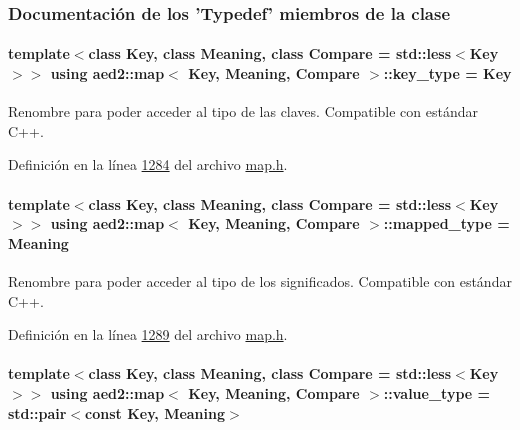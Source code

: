 \subsubsection{Documentación de los 'Typedef' miembros de la clase}
\hypertarget{classaed2_1_1map_a4273e8812e7105a618df58a2c8b72b7d_a4273e8812e7105a618df58a2c8b72b7d}{
\paragraph[{key\-\_\-type}]{\setlength{\rightskip}{0pt plus 5cm}template$<$class Key, class Meaning, class Compare = std\-::less$<$\-Key$>$$>$ using {\bf aed2\-::map}$<$ Key, Meaning, Compare $>$\-::{\bf key\-\_\-type} =  Key}}\label{classaed2_1_1map_a4273e8812e7105a618df58a2c8b72b7d_a4273e8812e7105a618df58a2c8b72b7d}


Renombre para poder acceder al tipo de las claves. Compatible con estándar C++. 



Definición en la línea \hyperlink{map_8h_source_l01284}{1284} del archivo \hyperlink{map_8h_source}{map.\-h}.

\hypertarget{classaed2_1_1map_aa3e34bf624f3009884a71b18f4ddae40_aa3e34bf624f3009884a71b18f4ddae40}{
\paragraph[{mapped\-\_\-type}]{\setlength{\rightskip}{0pt plus 5cm}template$<$class Key, class Meaning, class Compare = std\-::less$<$\-Key$>$$>$ using {\bf aed2\-::map}$<$ Key, Meaning, Compare $>$\-::{\bf mapped\-\_\-type} =  Meaning}}\label{classaed2_1_1map_aa3e34bf624f3009884a71b18f4ddae40_aa3e34bf624f3009884a71b18f4ddae40}


Renombre para poder acceder al tipo de los significados. Compatible con estándar C++. 



Definición en la línea \hyperlink{map_8h_source_l01289}{1289} del archivo \hyperlink{map_8h_source}{map.\-h}.

\hypertarget{classaed2_1_1map_a719db98e0ff9a837610f76be33264680_a719db98e0ff9a837610f76be33264680}{
\paragraph[{value\-\_\-type}]{\setlength{\rightskip}{0pt plus 5cm}template$<$class Key, class Meaning, class Compare = std\-::less$<$\-Key$>$$>$ using {\bf aed2\-::map}$<$ Key, Meaning, Compare $>$\-::{\bf value\-\_\-type} =  std\-::pair$<$const Key, Meaning$>$}}\label{classaed2_1_1map_a719db98e0ff9a837610f76be33264680_a719db98e0ff9a837610f76be33264680}


